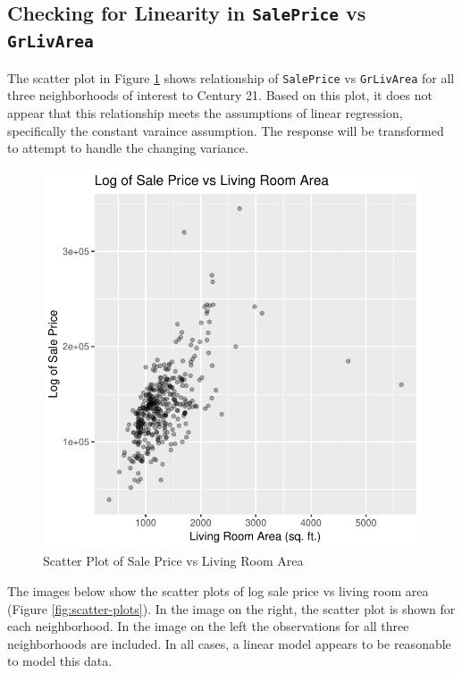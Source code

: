 \documentclass[american,]{article}
\begin{document}
\hypertarget{checking-for-linearity-in-saleprice-vs-grlivarea}{%
\subsection{\texorpdfstring{Checking for Linearity in \texttt{SalePrice}
vs
\texttt{GrLivArea}}{Checking for Linearity in SalePrice vs GrLivArea}}\label{checking-for-linearity-in-saleprice-vs-grlivarea}}

\label{appendix:linearity}

The scatter plot in Figure \ref{fig:scatter-plot} shows relationship of
\texttt{SalePrice} vs \texttt{GrLivArea} for all three neighborhoods of
interest to Century 21. Based on this plot, it does not appear that this
relationship meets the assumptions of linear regression, specifically
the constant varaince assumption. The response will be transformed to
attempt to handle the changing variance.

\begin{figure}[htbp]

{\centering \includegraphics[width=0.45\linewidth]{HousePriceRegressionAnalysis_files/figure-latex/scatter-plot-1} 

}

\caption{Scatter Plot of Sale Price vs Living Room Area}\label{fig:scatter-plot}
\end{figure}

The images below show the scatter plots of log sale price vs living room
area (Figure \ref{fig:scatter-plots}). In the image on the right, the
scatter plot is shown for each neighborhood. In the image on the left
the observations for all three neighborhoods are included. In all cases,
a linear model appears to be reasonable to model this data.
\end{document}
